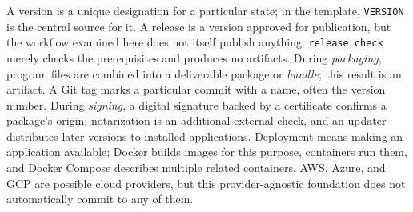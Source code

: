 \begin{beginnerstatement}

A version is a unique designation for a particular state; in the template,
\texttt{VERSION} is the central source for it. A release is a version approved
for publication, but the workflow examined here does not itself publish
anything. \texttt{release check} merely checks the prerequisites and produces
no artifacts. During \emph{packaging}, program files are combined into a
deliverable package or \emph{bundle}; this result is an artifact. A Git tag
marks a particular commit with a name, often the version number. During
\emph{signing}, a digital signature backed by a certificate confirms a
package's origin; notarization is an additional external check, and an updater
distributes later versions to installed applications. Deployment means making
an application available; Docker builds images for this purpose, containers
run them, and Docker Compose describes multiple related containers. AWS,
Azure, and GCP are possible cloud providers, but this provider-agnostic
foundation does not automatically commit to any of them.

\end{beginnerstatement}

